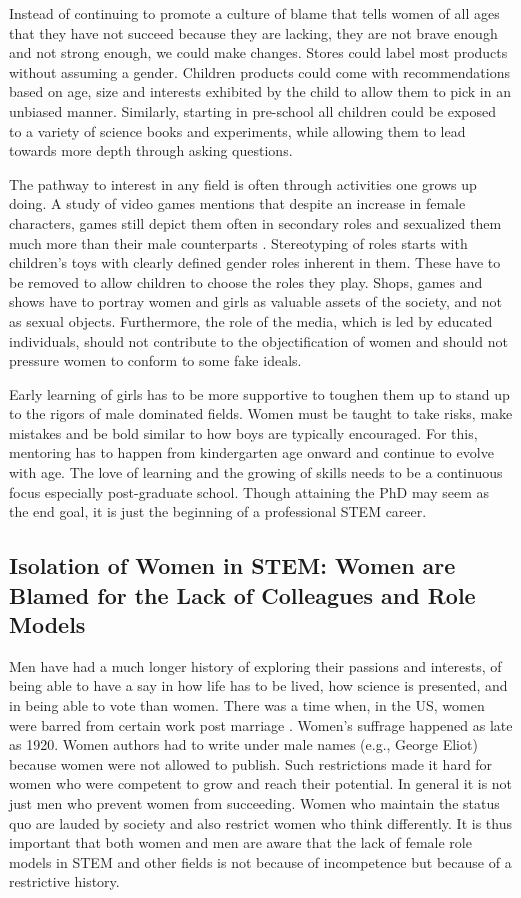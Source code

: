 \documentclass[utf8]{frontiersSCNS} %
\begin{document}
Instead of continuing to promote a culture of blame that tells women of all ages that they have not succeed because they are lacking, they are not brave enough and not strong enough, we could make changes.  Stores could label most products without assuming a gender. Children products could come with recommendations based on age, size and interests exhibited by the child to allow them to pick in an unbiased manner. Similarly, starting in pre-school all children could be exposed to a variety of science books and experiments, while allowing them to lead towards more depth through asking questions.

The pathway to interest in any field is often through activities one grows up doing. A study of video games mentions that despite an increase in female characters, games still depict them often in secondary roles and sexualized them much more than their male counterparts \citep{lynch2016sexy}. Stereotyping of roles starts with children’s toys with clearly defined gender roles inherent in them. These have to be removed to allow children to choose the roles they play.  Shops, games and shows have to portray women and girls as valuable assets of the society, and not as sexual objects. Furthermore, the role of the media, which is led by educated individuals, should not contribute to the objectification of women and should not  pressure women to conform to some fake ideals.

Early learning of girls has to be more supportive to toughen them up to stand up to the rigors of male dominated fields.  Women must be taught to take risks, make mistakes and be bold similar to how boys are typically encouraged. For this, mentoring has to happen from kindergarten age onward and continue to evolve with age. The love of learning and the growing of skills needs to be a continuous focus especially post-graduate school. Though attaining the PhD may seem as the end goal, it is just the beginning of a professional STEM career.

\subsection{Isolation of Women in STEM: Women are Blamed for the Lack of Colleagues and Role Models}
\label{Sec3}
Men have had a much longer history of exploring their passions and interests, of being able to have a say in how life has to be lived, how science is presented, and in being able to vote than women. There was a time when, in the US, women were barred from certain work post marriage \citep{rindfuss1996women}. Women’s suffrage happened as late as 1920. Women authors had to write under male names (e.g., George Eliot) because women were not allowed to publish. Such restrictions made it hard for women who were competent to grow and reach their potential. In general it is not just men who prevent women from succeeding. Women who maintain the status quo are lauded by society and also restrict women who think differently. It is thus important that both women and men are aware that the lack of female role models in STEM and other fields is not because of incompetence but because of a restrictive history.
\end{document}
